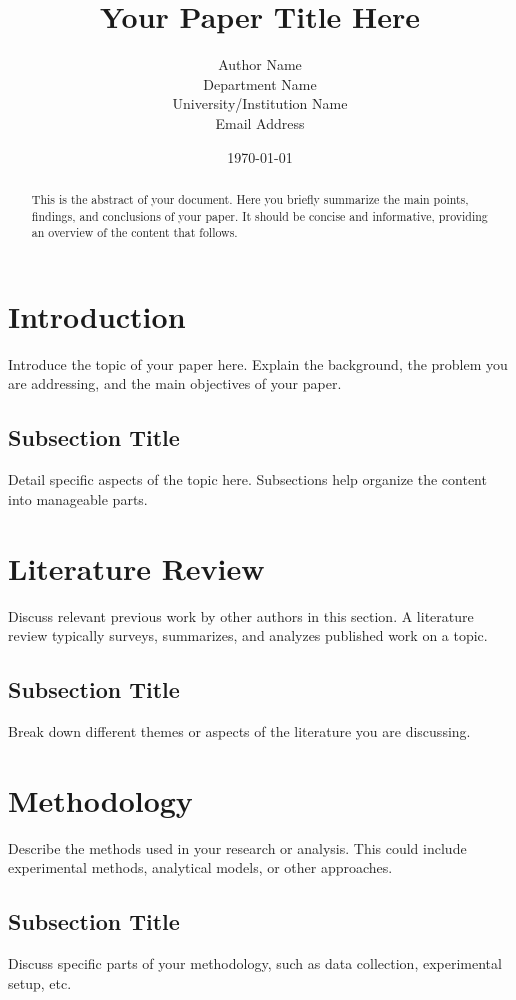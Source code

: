 \documentclass[11pt,a4paper]{article}
\title{Your Paper Title Here}
\author{
    Author Name\\
    Department Name\\
    University/Institution Name\\
    Email Address
}
\date{\today} %
\begin{document}
\maketitle

\begin{abstract}
This is the abstract of your document. Here you briefly summarize the main points, findings, and conclusions of your paper. It should be concise and informative, providing an overview of the content that follows.
\end{abstract}

\section{Introduction}
Introduce the topic of your paper here. Explain the background, the problem you are addressing, and the main objectives of your paper.

\subsection{Subsection Title}
Detail specific aspects of the topic here. Subsections help organize the content into manageable parts.

\section{Literature Review}
Discuss relevant previous work by other authors in this section. A literature review typically surveys, summarizes, and analyzes published work on a topic.

\subsection{Subsection Title}
Break down different themes or aspects of the literature you are discussing.

\section{Methodology}
Describe the methods used in your research or analysis. This could include experimental methods, analytical models, or other approaches.

\subsection{Subsection Title}
Discuss specific parts of your methodology, such as data collection, experimental setup, etc.
\end{document}
